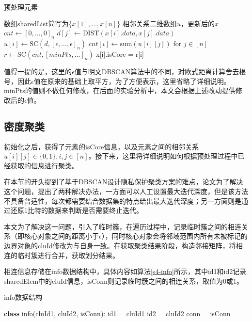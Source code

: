 \begin{algorithm}[htbp]
	\renewcommand{\algorithmicrequire}{\textbf{输入:}}
	\renewcommand{\algorithmicensure}{\textbf{输出:}}
	\caption{预处理元素}
	\label{alg_t1_s1}
	\begin{algorithmic}[1]
		\REQUIRE 数组sharedList简写为$ \{x[1],...,x[n]\} $
		\ENSURE 相邻关系二维数组$ u $，更新后的$ x $
		\STATE $ cnt \leftarrow [0,...,0]_n $
		\STATE $ d[j] \leftarrow \text{DIST}(x[i].data, x[j].data) $
		\ENDFOR
		\STATE $ u[i] \leftarrow \text{SC}(d, [\epsilon,...,\epsilon]_n) $
		\STATE $ cnt[i] \leftarrow \text{sum}(u[i][j])$ for $j \in [n] $
		\ENDFOR
		\STATE $ r \leftarrow \text{SC}(cnt, [minPts,...]_n) $
		\STATE x[i].isCore = r[i]
		\ENDFOR
	\end{algorithmic}
\end{algorithm}

值得一提的是，这里的$\epsilon$值与明文DBSCAN算法中的不同，对欧式距离计算舍去根号，因此$\epsilon$值在原来的基础上取平方，为了方便表示，这里省略了详细说明。minPts的值则不做任何修改，在后面的实验分析中，本文会根据上述改动提供修改后的$ \epsilon $值。


\subsection{密度聚类}
\label{t1-julei}
初始化之后，获得了元素的isCore信息，以及元素之间的相邻关系$ u[i][j] \in \{0,1\},i,j\in[n]$。接下来，这里将详细说明如何根据预处理过程中已经获取的信息进行聚类。

在本节的开头提到了基于DBSCAN设计隐私保护聚类方案的难点，论文\cite{bozdemir2021privacy}为了解决这个问题，提出了两种解决办法，一方面可以人工设置最大迭代深度，但是该方法不具备普适性，每次都需要结合数据集的特点给出最大迭代深度；另一方面则是通过还原1比特的数据来判断是否需要终止迭代。

本文为了解决这一问题，引入了临时簇，在遍历过程中，记录临时簇之间的相连关系（即核心对象之间的距离小于$\epsilon$），同时核心对象会将邻域范围内所有未被标记的边界对象的cluId修改为与自身一致。在获取聚类结果阶段，构造邻接矩阵，将相连的临时簇进行合并，获取划分结果。

相连信息存储在info数据结构中，具体内容如算法\ref{s4-info}所示，其中id1和id2记录sharedElem中的cluId信息，isConn则记录临时簇之间的相连关系，取值为0或1。
\begin{algorithm}
	\caption{info数据结构}
	\label{s4-info}
	\begin{algorithmic}[1]
		\STATE \textbf{class} info(cluId1, cluId2, isConn):
		\STATE \hspace{\algorithmicindent} id1 = cluId1
		\STATE \hspace{\algorithmicindent} id2 = cluId2
		\STATE \hspace{\algorithmicindent} conn = isConn
	\end{algorithmic}
\end{algorithm}


